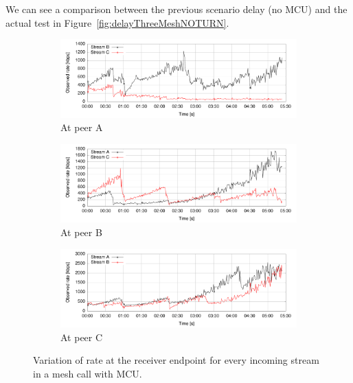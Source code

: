 We can see a comparison between the previous scenario delay (no MCU) and the actual test in Figure~\ref{fig:delayThreeMeshNOTURN}.

\begin{figure}[h]
        \centering
        \begin{subfigure}[b]{1\textwidth}
                \centering
                \includegraphics[width=\textwidth]{./figures/nodeA_turn.pdf}
                \caption{At peer A}
                \label{fig:meshA_turn}
        \end{subfigure}
        
        \begin{subfigure}[b]{1\textwidth}
                \centering
                \includegraphics[width=\textwidth]{./figures/nodeB_turn.pdf}
                \caption{At peer B}
                \label{fig:meshB_turn}
        \end{subfigure} 
               
        \begin{subfigure}[b]{1\textwidth}
                \centering
                \includegraphics[width=\textwidth]{./figures/nodeC_turn.pdf}
                \caption{At peer C}
                \label{fig:meshC_turn}
        \end{subfigure}
        \caption[Variation of rate at the receiver endpoint for every incoming stream in a mesh call with MCU]{Variation of rate at the receiver endpoint for every incoming stream in a mesh call with MCU.}
        \label{fig:meshTurn}
\end{figure}

